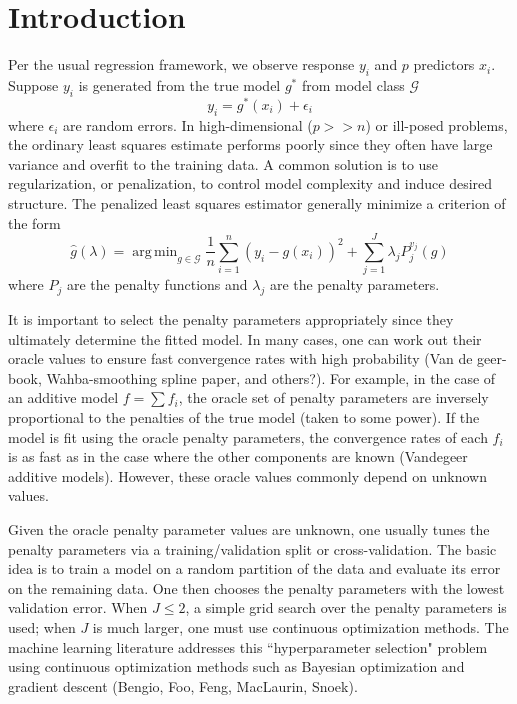 \documentclass[12pt]{article}
\DeclareMathOperator*{\argmin}{arg\,min}
\begin{document}
\newpage
{} %
\section{Introduction}

Per the usual regression framework, we observe response $y_i$ and $p$ predictors $x_i$. Suppose $y_i$ is generated from the true model $g^*$ from model class $\mathcal{G}$
\begin{equation}
y_i = g^*(x_i) + \epsilon_i
\end{equation}
where $\epsilon_i$ are random errors. In high-dimensional ($p >> n$) or ill-posed problems, the ordinary least squares estimate performs poorly since they often have large variance and overfit to the training data. A common solution is to use regularization, or penalization, to control model complexity and induce desired structure. The penalized least squares estimator generally minimize a criterion of the form
\begin{equation}
\label{orig_train_criterion}
\hat{g}(\lambda) = \argmin_{g\in \mathcal{G}} \frac{1}{n} \sum_{i=1}^n \left (y_i -  g(x_i) \right )^2 + \sum_{j=1}^J \lambda_j P^{v_j}_j(g)
\end{equation}
where $P_j$ are the penalty functions and $\lambda_j$ are the penalty parameters.

It is important to select the penalty parameters appropriately since they ultimately determine the fitted model. In many cases, one can work out their oracle values to ensure fast convergence rates with high probability (Van de geer-book, Wahba-smoothing spline paper, and others?). For example, in the case of an additive model $f = \sum f_i$, the oracle set of penalty parameters are inversely proportional to the penalties of the true model (taken to some power). If the model is fit using the oracle penalty parameters, the convergence rates of each $f_i$ is as fast as in the case where the other components are known (Vandegeer additive models). However, these oracle values commonly depend on unknown values.

Given the oracle penalty parameter values are unknown, one usually tunes the penalty parameters via a training/validation split or cross-validation. The basic idea is to train a model on a random partition of the data and evaluate its error on the remaining data. One then chooses the penalty parameters with the lowest validation error. When $J \le 2$, a simple grid search over the penalty parameters is used; when $J$ is much larger, one must use continuous optimization methods. The machine learning literature addresses this ``hyperparameter selection" problem using continuous optimization methods such as Bayesian optimization and gradient descent (Bengio, Foo, Feng, MacLaurin, Snoek).
\end{document}
